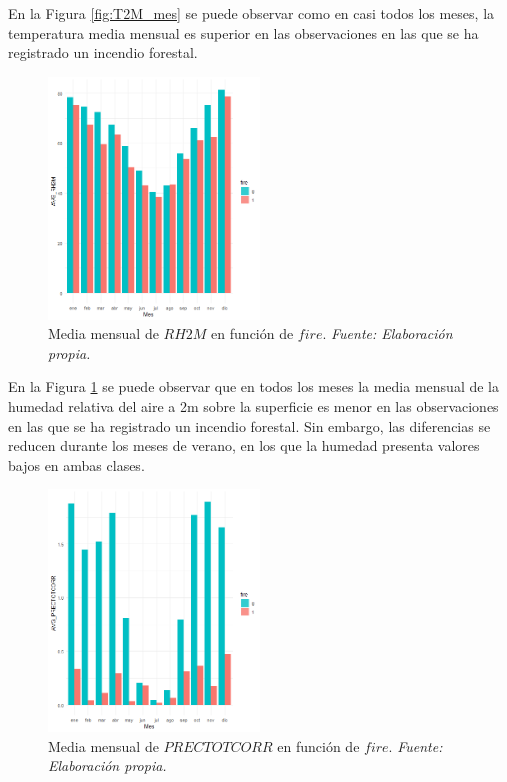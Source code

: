 \documentclass[12pt,a4paper,]{book}
\numberwithin{dummy}{section}
\theoremstyle{ocrenumbox}
\theoremstyle{blacknumex}
\theoremstyle{blacknumbox}
\theoremstyle{ocrenum}
\theoremstyle{ocrenum}
\begin{document}
En la Figura \ref{fig:T2M_mes} se puede observar como en casi todos los
meses, la temperatura media mensual es superior en las observaciones en
las que se ha registrado un incendio forestal.

\begin{figure}[H]
\centering
\includegraphics[width =0.5\textwidth]{graficos/RH2M_mes.png}
\caption{Media mensual de $RH2M$ en función de  $fire$. \it Fuente: Elaboración propia.}
\label{fig:RH2M_mes}
\end{figure}

En la Figura \ref{fig:RH2M_mes} se puede observar que en todos los meses
la media mensual de la humedad relativa del aire a 2m sobre la
superficie es menor en las observaciones en las que se ha registrado un
incendio forestal. Sin embargo, las diferencias se reducen durante los
meses de verano, en los que la humedad presenta valores bajos en ambas
clases.

\begin{figure}[H]
\centering
\includegraphics[width =0.5\textwidth]{graficos/PRECTOTCORR_mes.png}
\caption{Media mensual de $PRECTOTCORR$ en función de $fire$. \it Fuente: Elaboración propia.}
\label{fig:PRECTOTCORR_mes}
\end{figure}
\end{document}
